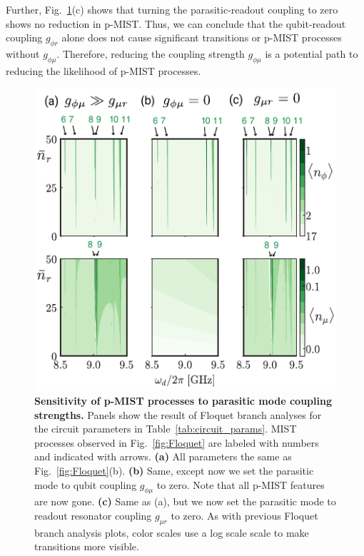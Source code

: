 \documentclass[%
reprint,
superscriptaddress,
 amsmath,amssymb,
 aps,
 prx,
longbibliography,
floatfix,
]{revtex4-2}
\begin{document}
Further, Fig.~\ref{fig:coupling-Floquet}(c) shows that turning the parasitic-readout coupling to zero shows no reduction in p-MIST. Thus, we can conclude that the qubit-readout coupling $g_{\phi r}$ alone does not cause significant transitions or p-MIST processes without $g_{\phi \mu}$. Therefore, reducing the coupling strength $g_{\phi \mu}$ is a potential path to reducing the likelihood of p-MIST processes. 
\begin{figure}[t]
    \centering
    \includegraphics[width=\linewidth]{Figures/Floquet_coupling.pdf}
    \caption{
    {\bf Sensitivity of p-MIST processes to parasitic mode coupling strengths.} Panels show the result of Floquet branch analyses for the circuit parameters in Table~\ref{tab:circuit_params}. MIST processes observed in Fig.~\ref{fig:Floquet} are labeled with numbers and indicated with arrows. \textbf{(a)} All parameters the same as Fig.~\ref{fig:Floquet}(b). \textbf{(b)} Same, except now we set the parasitic mode to qubit coupling $g_{\phi \mu}$ to zero.  Note that all p-MIST features are now gone.  \textbf{(c)} Same as (a), but we now set the parasitic mode to readout resonator coupling $g_{\mu r}$ to zero.  As with previous Floquet branch analysis plots, color scales use a log scale scale to make transitions more visible.}
    \label{fig:coupling-Floquet}
\end{figure}
\end{document}
